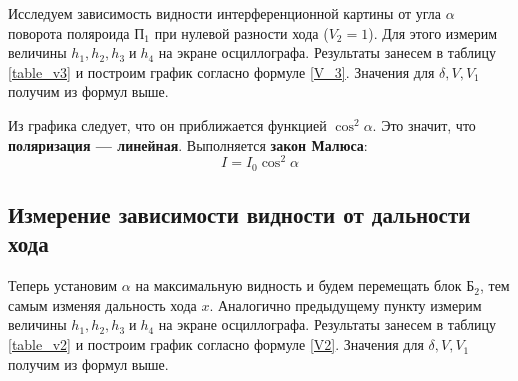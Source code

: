 \documentclass[a4paper,12pt]{article} %
\begin{document}
Исследуем зависимость видности интерференционной картины от угла
$ \alpha $ поворота поляроида $ \text{П}_1 $ при нулевой разности хода ($ V_2 = 1 $). Для этого измерим величины $ h_1, h_2, h_3 \; \text{и} \; h_4 $ на экране осциллографа. Результаты занесем в таблицу \ref{table_v3} и построим график согласно формуле \eqref{V_3}. Значения для $ \delta, V, V_1 $ получим из формул выше.


\begin{center}
\end{center}


Из графика следует, что он приближается функцией $ \cos^2 \alpha $. Это значит, что \textbf{поляризация --- линейная}. Выполняется \textbf{закон Малюса}:
\[ I = I_0 \cos^2\alpha \]


\subsection{Измерение зависимости видности от дальности хода}

Теперь установим $ \alpha $ на максимальную видность и будем перемещать блок $ \text{Б}_2 $, тем самым изменяя дальность хода $ x $. Аналогично предыдущему пункту измерим величины $ h_1, h_2, h_3 \; \text{и} \; h_4 $ на экране осциллографа. Результаты занесем в таблицу \ref{table_v2} и построим график согласно формуле \eqref{V2}. Значения для $ \delta, V, V_1 $ получим из формул выше.
\end{document}
